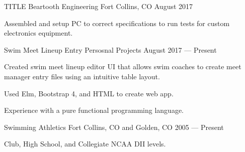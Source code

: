 \begin{cventries}
  \cventry
    {TITLE} %
    {Beartooth Engineering} %
    {Fort Collins, CO} %
    {August 2017} %
    {
      \begin{cvitems} %
        \item {Assembled and setup PC to correct specifications to run tests for custom electronics equipment.}
      \end{cvitems}
    }


  \cventry
    {Swim Meet Lineup Entry}
    {Persosnal Projects} %
    {} %
    {August 2017 --- Present} %
    {
      \begin{cvitems} %
        \item {Created swim meet lineup editor UI that allows swim coaches to create meet manager entry files using an intuitive table layout.}
        \item {Used Elm, Bootstrap 4, and HTML to create web app.}
        \item {Experience with a pure functional programming language.}
        \end{cvitems}
   }

 \cventry
    {Swimming} %
    {Athletics} %
    {Fort Collins, CO and Golden, CO} %
    {2005 --- Present} %
    {
      \begin{cvitems} %
        \item {Club, High School, and Collegiate NCAA DII levels.}
      \end{cvitems}
   }

\end{cventries}
